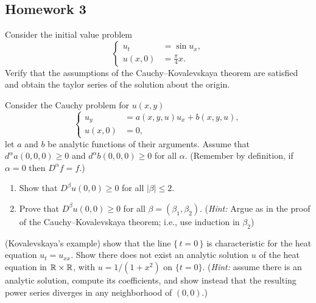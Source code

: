 \subsection{Homework 3}
\begin{problem}
  Consider the initial value problem
  \[
    \left\{
      \begin{aligned}
        u_t&=\sin u_x,\\
        u(x,0)&=\frac{\pi}{4}x.
      \end{aligned}
    \right.
  \]
  Verify that the assumptions of the Cauchy--Kovalevskaya theorem are
  satisfied and obtain the taylor series of the solution about the origin.
\end{problem}
\begin{solution*}
\end{solution*}

\begin{problem}
  Consider the Cauchy problem for \(u(x,y)\)
  \[
    \left\{
      \begin{aligned}
        u_y&=a(x, y, u)u_x+b(x,y,u),\\
        u(x,0)&=0,
      \end{aligned}
    \right.
  \]
  let \(a\) and \(b\) be analytic functions of their arguments. Assume that
  \(d^\alpha a(0,0,0)\geq 0\) and \(d^\alpha b(0,0,0)\geq 0\) for all
  \(\alpha\). (Remember by definition, if \(\alpha=0\) then
  \(D^\alpha f=f\).)
  \begin{enumerate}[label=(\alph*),noitemsep]
  \item Show that \(D^\beta u(0,0)\geq 0\) for all \(|\beta|\leq 2\).
  \item Prove that \(D^\beta u(0,0)\geq 0\) for all
    \(\beta=(\beta_1,\beta_2)\). (\emph{Hint:} Argue as in the proof of the
    Cauchy--Kovalevskaya theorem; i.e., use induction in \(\beta_2\))
  \end{enumerate}
\end{problem}
\begin{solution*}
\end{solution*}

\begin{problem}
  (Kovalevskaya's example) show that the line \(\{\,t=0\,\}\) is
  characteristic for the heat equation \(u_t=u_{xx}\). Show there does not
  exist an analytic solution \(u\) of the heat equation in
  \(\mathbb{R}\times\mathbb{R}\), with \(u=1/(1+x^2)\) on \(\{t=0\}\). (\emph{Hint:}
  assume there is an analytic solution, compute its coefficients, and show
  instead that the resulting power series diverges in any neighborhood of
  \((0,0)\).)
\end{problem}
\begin{solution*}
\end{solution*}

